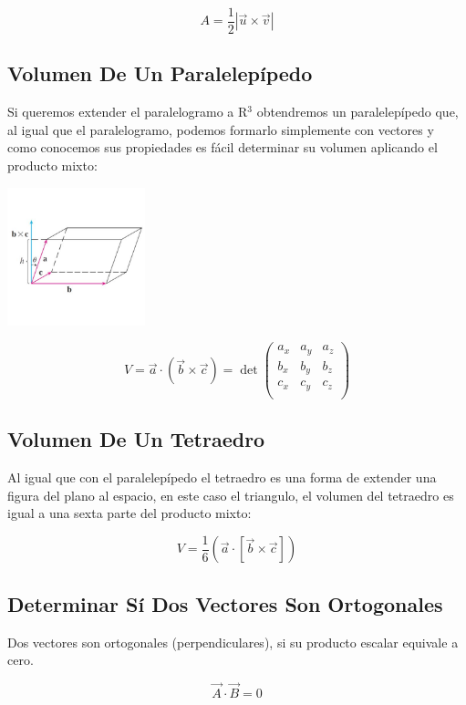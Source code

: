 \documentclass{article}
\begin{document}
\[
A = \frac{1}{2}|\vec{u}\times\vec{v}|
\]

\subsection{Volumen De Un Paralelepípedo}
\label{sec:org3e43e62}
Si queremos extender el paralelogramo a R\(^{\text{3}}\) obtendremos un paralelepípedo que, al igual que el paralelogramo, podemos formarlo simplemente con vectores y como conocemos sus propiedades es fácil determinar su volumen aplicando el producto mixto:

\begin{center}
\includegraphics[width=4cm]{img/paralelipedo.png}
\end{center}

\[
V = \vec{a}\cdot(\vec{b}\times\vec{c}) = \det\begin{pmatrix}
  a_x & a_y & a_z \\
  b_x & b_y & b_z \\
  c_x & c_y & c_z \\
\end{pmatrix}
\]

\subsection{Volumen De Un Tetraedro}
\label{sec:orgb201551}
Al igual que con el paralelepípedo el tetraedro es una forma de extender una figura del plano al espacio, en este caso el triangulo, el volumen del tetraedro es igual a una sexta parte del producto mixto:

\[
V = \frac{1}{6} \left( \vec{a}\cdot\left[\vec{b}\times\vec{c}\right] \right)
\]

\subsection{Determinar Sí Dos Vectores Son Ortogonales}
\label{sec:org937c441}
Dos vectores son ortogonales (perpendiculares), si su producto escalar equivale a cero.

\[
\vec{A} \cdot \vec{B} = 0
\]
\end{document}
